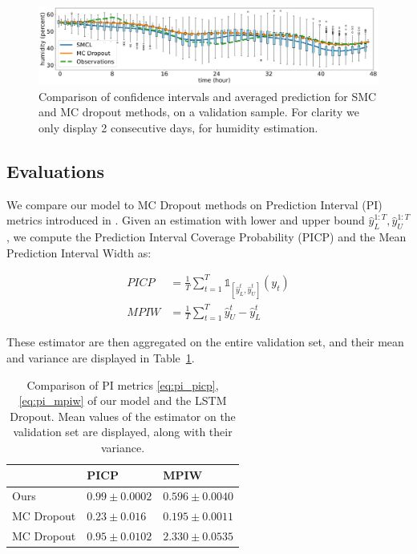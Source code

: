 \documentclass{article}
\begin{document}
\begin{figure}[htpb]
	\centering
	\includegraphics[width=\linewidth]{boxplot_comparison.png}
	\caption{Comparison of confidence intervals and averaged prediction for SMC and MC dropout methods, on a validation sample. For clarity we only display 2 consecutive days, for humidity estimation.}
	\label{fig:boxplot_comparison}
\end{figure}

\subsection{Evaluations}%
\label{sub:evaluations}

We compare our model to MC Dropout methods on Prediction Interval (PI) metrics introduced in \cite{Pearce2018}.
Given an estimation with lower and upper bound $\hat y_L^{1:T}, \hat y_U^{1:T}$, we compute the Prediction Interval Coverage Probability (PICP) and the Mean Prediction Interval Width as:

\begin{align}
	PICP & = \frac{1}{T} \sum^{T}_{t=1} \mathbb{1}_{[\hat y_L^t, \hat y_U^t]}(y_t) \label{eq:pi_picp} \\
	MPIW & = \frac{1}{T} \sum^{T}_{t=1} \hat y_U^t - \hat y_L^t \label{eq:pi_mpiw}
\end{align}

These estimator are then aggregated on the entire validation set, and their mean and variance are displayed in Table~\ref{tab:ci_comparison}.

\begin{table}[htpb]
	\centering
	\caption{Comparison of PI metrics \ref{eq:pi_picp}, \ref{eq:pi_mpiw} of our model and the LSTM Dropout. Mean values of the estimator on the validation set are displayed, along with their variance.}
	\label{tab:ci_comparison}
	\begin{tabular}{lll}
		\toprule
		             & PICP              & MPIW               \\
		\toprule
		Ours         & $0.99 \pm 0.0002$ & $0.596 \pm 0.0040$ \\
		MC Dropout & $0.23 \pm 0.016$  & $0.195 \pm 0.0011$ \\
		MC Dropout & $0.95 \pm 0.0102$ & $2.330 \pm 0.0535$ \\
		\bottomrule
	\end{tabular}
\end{table}
\end{document}
